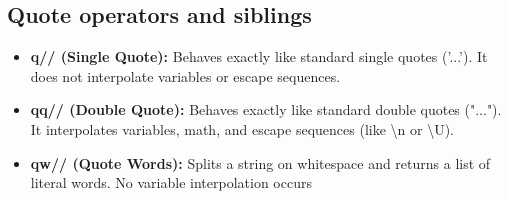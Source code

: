 \documentclass{report}
\begin{document}
\begin{itemize}
    \end{itemize}

    \pagebreak 
    \subsection{Quote operators and siblings}
    \begin{itemize}
        \item \textbf{q// (Single Quote):} Behaves exactly like standard single quotes ('...'). It does not interpolate variables or escape sequences.
        \item \textbf{qq// (Double Quote):} Behaves exactly like standard double quotes ("..."). It interpolates variables, math, and escape sequences (like \textbackslash n or \textbackslash U).
        \item \textbf{qw// (Quote Words):} Splits a string on whitespace and returns a list of literal words. No variable interpolation occurs
    \end{itemize}

    \pagebreak 
\end{document}
